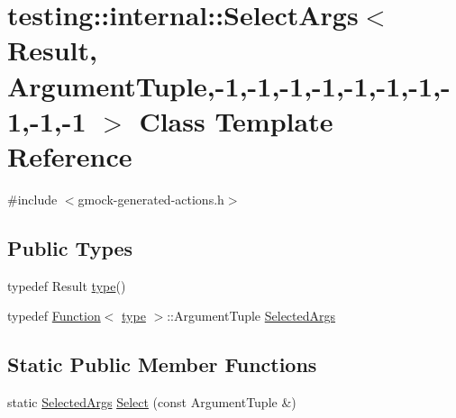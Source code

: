 \hypertarget{classtesting_1_1internal_1_1SelectArgs_3_01Result_00_01ArgumentTuple_00-1_00-1_00-1_00-1_00-1_00-1_00-1_00-1_00-1_00-1_01_4}{}\section{testing\+:\+:internal\+:\+:Select\+Args$<$ Result, Argument\+Tuple,-\/1,-\/1,-\/1,-\/1,-\/1,-\/1,-\/1,-\/1,-\/1,-\/1 $>$ Class Template Reference}
\label{classtesting_1_1internal_1_1SelectArgs_3_01Result_00_01ArgumentTuple_00-1_00-1_00-1_00-1_00-1_00-1_00-1_00-1_00-1_00-1_01_4}


{\ttfamily \#include $<$gmock-\/generated-\/actions.\+h$>$}

\subsection*{Public Types}
\begin{DoxyCompactItemize}
\item 
typedef Result \hyperlink{classtesting_1_1internal_1_1SelectArgs_3_01Result_00_01ArgumentTuple_00-1_00-1_00-1_00-1_00-1_00-1_00-1_00-1_00-1_00-1_01_4_ac0cd24f2f3bd5f52b1a864e4dd380322}{type}()
\item 
typedef \hyperlink{structtesting_1_1internal_1_1Function}{Function}$<$ \hyperlink{classtesting_1_1internal_1_1SelectArgs_3_01Result_00_01ArgumentTuple_00-1_00-1_00-1_00-1_00-1_00-1_00-1_00-1_00-1_00-1_01_4_ac0cd24f2f3bd5f52b1a864e4dd380322}{type} $>$\+::Argument\+Tuple \hyperlink{classtesting_1_1internal_1_1SelectArgs_3_01Result_00_01ArgumentTuple_00-1_00-1_00-1_00-1_00-1_00-1_00-1_00-1_00-1_00-1_01_4_adc60d51fe96e09fd5e41b2a61f998c54}{Selected\+Args}
\end{DoxyCompactItemize}
\subsection*{Static Public Member Functions}
\begin{DoxyCompactItemize}
\item 
static \hyperlink{classtesting_1_1internal_1_1SelectArgs_3_01Result_00_01ArgumentTuple_00-1_00-1_00-1_00-1_00-1_00-1_00-1_00-1_00-1_00-1_01_4_adc60d51fe96e09fd5e41b2a61f998c54}{Selected\+Args} \hyperlink{classtesting_1_1internal_1_1SelectArgs_3_01Result_00_01ArgumentTuple_00-1_00-1_00-1_00-1_00-1_00-1_00-1_00-1_00-1_00-1_01_4_a909bc989f5f80ecd5fcab22899b1e121}{Select} (const Argument\+Tuple \&)
\end{DoxyCompactItemize}


